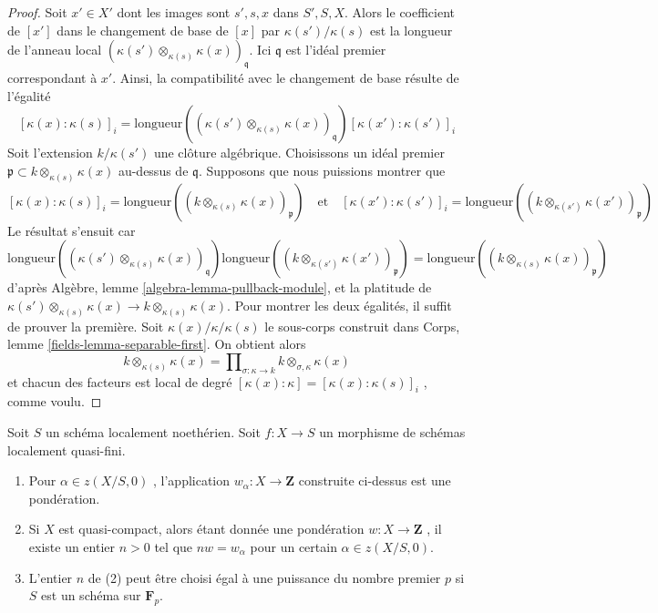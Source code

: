 \begin{proof} 
Soit  $x' \in X'$  dont les images sont  $s', s, x$  dans  $S', S, X$.
 Alors le coefficient de  $[x']$  dans
 le changement de base de  $[x]$  par $\kappa(s')/\kappa(s)$  est la longueur de
 l'anneau local  $(\kappa(s') \otimes_{\kappa(s)} \kappa(x))_\mathfrak q$.
 Ici  $\mathfrak q$  est l'idéal premier correspondant à  $x'$. 
Ainsi, la compatibilité avec le changement de base résulte de l'égalité 
$$
[\kappa(x) : \kappa(s)]_i =
\text{longueur}((\kappa(s') \otimes_{\kappa(s)} \kappa(x))_\mathfrak q)
[\kappa(x') : \kappa(s')]_i
$$
 Soit l'extension  $k/\kappa(s')$  une clôture algébrique. Choisissons un idéal premier  
$\mathfrak p \subset k \otimes_{\kappa(s)} \kappa(x)$ au-dessus
 de  $\mathfrak q$. Supposons que nous puissions montrer que 
$$
[\kappa(x) : \kappa(s)]_i =
\text{longueur}((k \otimes_{\kappa(s)} \kappa(x))_\mathfrak p)
\quad\text{et}\quad
[\kappa(x') : \kappa(s')]_i =
\text{longueur}((k \otimes_{\kappa(s')} \kappa(x'))_\mathfrak p)
$$
 Le résultat s'ensuit car 
$$
\text{longueur}((\kappa(s') \otimes_{\kappa(s)} \kappa(x))_\mathfrak q)
\text{longueur}((k \otimes_{\kappa(s')} \kappa(x'))_\mathfrak p)
=
\text{longueur}((k \otimes_{\kappa(s)} \kappa(x))_\mathfrak p)
$$
 d'après Algèbre, lemme \ref{algebra-lemma-pullback-module}, et la platitude de  
$\kappa(s') \otimes_{\kappa(s)} \kappa(x) \to k \otimes_{\kappa(s)} \kappa(x)$.
 Pour montrer les deux égalités, il suffit de prouver la première. 
Soit  $\kappa(x)/\kappa/\kappa(s)$  le sous-corps construit dans
 Corps, lemme \ref{fields-lemma-separable-first}. On obtient alors 
$$
k \otimes_{\kappa(s)} \kappa(x) =
\prod\nolimits_{\sigma : \kappa \to k}
k \otimes_{\sigma, \kappa} \kappa(x)
$$
 et chacun des facteurs est local de degré  
$[\kappa(x) : \kappa] = [\kappa(x) : \kappa(s)]_i$
 , comme voulu. 
\end{proof} 

\begin{lemma} 
\label{lemma-weightings} 
Soit  $S$  un schéma localement noethérien. Soit  $f : X \to S$  un morphisme
 de schémas localement quasi-fini. 
\begin{enumerate} 
\item Pour  $\alpha \in z(X/S, 0)$ , l'application  $w_\alpha : X \to \mathbf{Z}$
  construite ci-dessus est une pondération. 
\item Si  $X$  est quasi-compact, alors étant donnée une pondération 
$w : X \to \mathbf{Z}$ , il existe un entier  $n > 0$  tel 
que  $nw = w_\alpha$  pour un certain  $\alpha \in z(X/S, 0)$. 
\item L'entier  $n$  de (2) peut être choisi égal à une puissance du 
nombre premier  $p$  si  $S$  est un schéma sur  $\mathbf{F}_p$. 
\end{enumerate} 
\end{lemma} 

